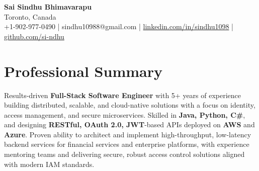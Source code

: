 \documentclass[letterpaper,11pt]{article}
\begin{document}
\begin{center}
  {\Large \textbf{Sai Sindhu Bhimavarapu}} \\
  Toronto, Canada \\
  +1-902-977-0490 \enspace | \enspace sindhu10988@gmail.com \enspace | \enspace \href{https://www.linkedin.com/in/sindhu1098/}{linkedin.com/in/sindhu1098} \enspace | \enspace \href{https://github.com/si-ndhu}{github.com/si-ndhu}
\end{center}

\section{Professional Summary}
  \begin{itemize}[leftmargin=0.15in, label={}]
    \small{\item{
     Results-driven \textbf{Full-Stack Software Engineer} with 5+ years of experience building distributed, scalable, and cloud-native solutions with a focus on identity, access management, and secure microservices. Skilled in \textbf{Java, Python, C\#}, and designing \textbf{RESTful, OAuth 2.0, JWT}-based APIs deployed on \textbf{AWS} and \textbf{Azure}. Proven ability to architect and implement high-throughput, low-latency backend services for financial services and enterprise platforms, with experience mentoring teams and delivering secure, robust access control solutions aligned with modern IAM standards.
    }}
  \end{itemize}
\vspace{-16pt}

\end{document}
